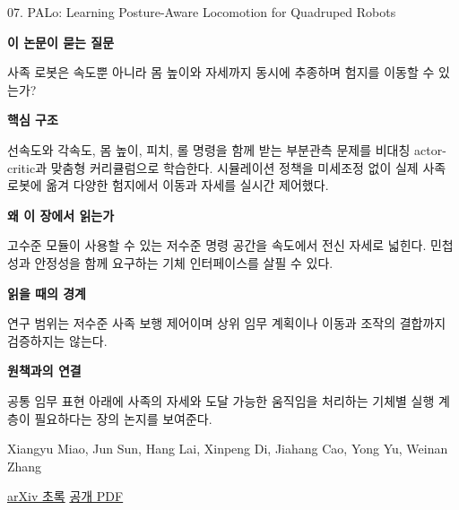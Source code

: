 \documentclass[11pt,openany]{book}
\begin{document}
\begin{termcard}{07. PALo: Learning Posture-Aware Locomotion for Quadruped Robots}

\par

\medskip

{\sffamily\bfseries\color{deepblue} 이 논문이 묻는 질문}\par

사족 로봇은 속도뿐 아니라 몸 높이와 자세까지 동시에 추종하며 험지를 이동할 수 있는가?

\smallskip

{\sffamily\bfseries\color{deepblue} 핵심 구조}\par

선속도와 각속도, 몸 높이, 피치, 롤 명령을 함께 받는 부분관측 문제를 비대칭 actor-critic과 맞춤형 커리큘럼으로 학습한다. 시뮬레이션 정책을 미세조정 없이 실제 사족 로봇에 옮겨 다양한 험지에서 이동과 자세를 실시간 제어했다.

\smallskip

{\sffamily\bfseries\color{deepblue} 왜 이 장에서 읽는가}\par

고수준 모듈이 사용할 수 있는 저수준 명령 공간을 속도에서 전신 자세로 넓힌다. 민첩성과 안정성을 함께 요구하는 기체 인터페이스를 살필 수 있다.

\smallskip

{\sffamily\bfseries\color{coral} 읽을 때의 경계}\par

연구 범위는 저수준 사족 보행 제어이며 상위 임무 계획이나 이동과 조작의 결합까지 검증하지는 않는다.

\smallskip

{\sffamily\bfseries\color{teal} 원책과의 연결}\par

공통 임무 표현 아래에 사족의 자세와 도달 가능한 움직임을 처리하는 기체별 실행 계층이 필요하다는 장의 논지를 보여준다.

\medskip

{\footnotesize\color{muted} Xiangyu Miao, Jun Sun, Hang Lai, Xinpeng Di, Jiahang Cao, Yong Yu, Weinan Zhang\par

\href{https://arxiv.org/abs/2503.04462}{arXiv 초록} \quad \href{https://arxiv.org/pdf/2503.04462}{공개 PDF}\par}

\end{termcard}
\end{document}
